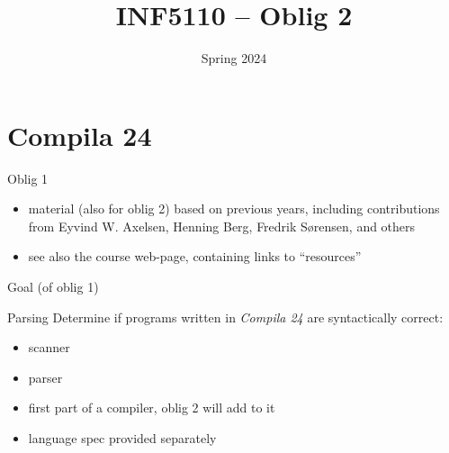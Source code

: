 \documentclass{beamer}
\date{Spring 2024}
\title{INF5110 -- Oblig  2}
\renewcommand{\maketitle}{}
\begin{document}
\maketitle
\section{Compila 24}
\label{sec:org65172c1}

\begin{frame}[label={sec:org99605b6}]{Oblig 1}
  \begin{itemize}
  \item material (also for oblig 2) based on previous years, including contributions from Eyvind
    W. Axelsen, Henning Berg, Fredrik Sørensen, and others
  \end{itemize}
  
  
  \begin{itemize}
  \item see also the course web-page, containing links to ``resources''
  \end{itemize}
\end{frame}
\begin{frame}[label={sec:orgb218816}]{Goal (of oblig 1)}
  \begin{block}{Parsing}
    Determine if programs written in \emph{Compila 24} are syntactically correct: 
    
    \begin{itemize}
    \item scanner
    \item parser
    \end{itemize}
  \end{block}
  \begin{itemize}
  \item first part of a compiler, oblig 2 will add to it
  \item language spec provided separately
  \end{itemize}
\end{frame}
\end{document}
